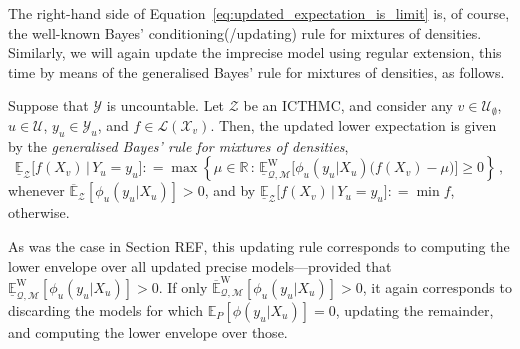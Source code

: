 \documentclass[twoside,11pt]{article}
\newcommand{\reals}{\mathbb{R}}
\newcommand{\states}{\mathcal{X}}
\newcommand{\observs}{\mathcal{Y}}
\newcommand{\lexp}{\underline{\mathbb{E}}_{\rateset,\mathcal{M}}^\mathrm{W}}
\newcommand{\uexp}{\overline{\mathbb{E}}_{\rateset,\mathcal{M}}^\mathrm{W}}
\newcommand{\gambles}{\mathcal{L}}
\newcommand{\rateset}{\mathcal{Q}}
\newcommand{\coloneqq}{:\!=}
\begin{document}
The right-hand side of Equation~\eqref{eq:updated_expectation_is_limit} is, of course, the well-known Bayes' conditioning(/updating) rule for mixtures of densities. Similarly, we will again update the imprecise model using regular extension, this time by means of the generalised Bayes' rule for mixtures of densities, as follows.

\begin{definition}
Suppose that $\observs$ is uncountable. Let $\mathcal{Z}$ be an ICTHMC, and consider any $v\in\mathcal{U}_\emptyset$, $u\in\mathcal{U}$, $y_u\in\observs_u$, and $f\in\gambles(\states_v)$. Then, the updated lower expectation is given by the \emph{generalised Bayes' rule for mixtures of densities},
\begin{equation*}
\underline{\mathbb{E}}_{\mathcal{Z}}\bigl[f(X_v)\,\vert\,Y_u = y_u\bigr] \coloneqq \max\left\{\mu\in\reals\,:\, \lexp\bigl[\phi_u(y_u\vert X_u)\bigl(f(X_v) - \mu\bigr)\bigr] \geq 0\right\}\,,
\end{equation*}
whenever $\overline{\mathbb{E}}_\mathcal{Z}[\phi_u(y_u\vert X_u)] >0$, and by $\underline{\mathbb{E}}_{\mathcal{Z}}\bigl[f(X_v)\,\vert\,Y_u=y_u\bigr]\coloneqq\min f$, otherwise.
\end{definition}

As was the case in Section REF, this updating rule corresponds to computing the lower envelope over all updated precise models---provided that $\lexp[\phi_u(y_u\vert X_u)]>0$. If only $\uexp[\phi_u(y_u\vert X_u)]>0$, it again corresponds to discarding the models for which $\mathbb{E}_P[\phi(y_u\vert X_u)]=0$, updating the remainder, and computing the lower envelope over those.
\end{document}
